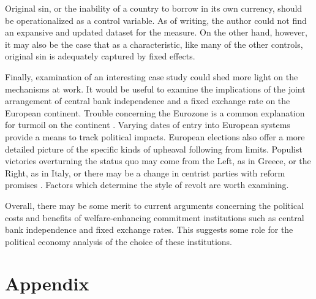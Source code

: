 \documentclass{article}
\begin{document}
    Original sin, or the inability of a country to borrow in its own currency, should be operationalized as a control variable. As of writing, the author could not find an expansive and updated dataset for the measure. On the other hand, however, it may also be the case that as a characteristic, like many of the other controls, original sin is adequately captured by fixed effects.

    Finally, examination of an interesting case study could shed more light on the mechanisms at work. It would be useful to examine the implications of the joint arrangement of central bank independence and a fixed exchange rate on the European continent. Trouble concerning the Eurozone is a common explanation for turmoil on the continent \citep{stiglitz_joseph_2016}. Varying dates of entry into European systems provide a means to track political impacts. European elections also offer a more detailed picture of the specific kinds of upheaval following from limits. Populist victories overturning the status quo may come from the Left, as in Greece, or the Right, as in Italy, or there may be a change in centrist parties with reform promises \citep{henley_how_2018}. Factors which determine the style of revolt are worth examining.

    Overall, there may be some merit to current arguments concerning the political costs and benefits of welfare-enhancing commitment institutions such as central bank independence and fixed exchange rates. This suggests some role for the political economy analysis of the choice of these institutions.
    
    \clearpage
    \newpage

    
    

    \clearpage
    \newpage

    \appendix

    \section*{Appendix}

    

    

    

    

    
\end{document}
